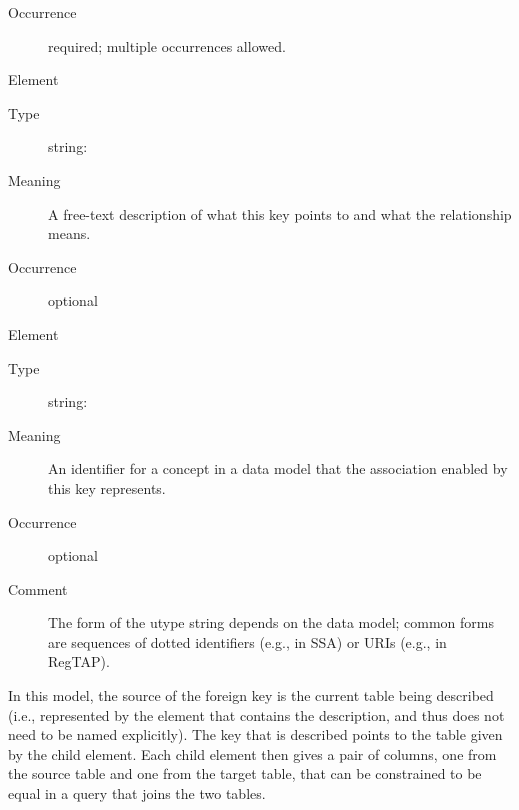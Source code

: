 \documentclass[11pt,a4paper]{ivoa}
\begin{document}
\begin{generated}
\begin{bigdescription}
\begin{description}
\item[Occurrence] required; multiple occurrences allowed.

\end{description}
\item[Element \xmlel{description}]
\begin{description}
\item[Type] string: 
\item[Meaning]
                  A free-text description of what this key points to
                  and what the relationship means.

\item[Occurrence] optional

\end{description}
\item[Element \xmlel{utype}]
\begin{description}
\item[Type] string: 
\item[Meaning]
                  An identifier for a concept in a data model that
                  the association enabled by this key represents.

\item[Occurrence] optional
\item[Comment]
                  The form of the utype string depends on the data
                  model; common forms are sequences of dotted identifiers
                  (e.g., in SSA) or URIs (e.g., in RegTAP).


\end{description}


\end{bigdescription}\endgroup

\endgroup
\end{generated}



In this model, the source of the foreign
key is the current table being described (i.e., represented by the
 element that contains the
 description, and thus does not need to be
named explicitly).  The key that is described points to the table
given by the  child element.  Each child
 element then gives a pair of columns, one
from the source table and one from the target table, that can be
constrained to be equal in a query that joins the two tables.
\end{document}
